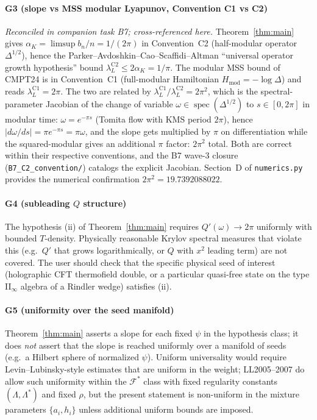 \documentclass[11pt]{article}
\theoremstyle{definition}
\DeclareMathOperator{\spec}{spec}
\newcommand{\modop}{\Delta}
\newcommand{\modhalf}{\modop^{1/2}}
\begin{document}
\paragraph{G3 (slope vs MSS modular Lyapunov, Convention C1 vs C2)}
\emph{Reconciled in companion task B7; cross-referenced here.}
Theorem~\ref{thm:main} gives $\alpha_K=\limsup b_n/n=1/(2\pi)$ in
Convention~C2 (half-modular operator $\modhalf$), hence the
Parker--Avdoshkin--Cao--Scaffidi--Altman ``universal operator growth
hypothesis'' bound $\lambda_L^{\mathrm{C2}}\le 2\alpha_K=1/\pi$.
The modular MSS bound of CMPT24 is in Convention~C1 (full-modular
Hamiltonian $H_{\mathrm{mod}}=-\log\modop$) and reads
$\lambda_L^{\mathrm{C1}}=2\pi$.  The two are related by
$\lambda_L^{\mathrm{C1}}/\lambda_L^{\mathrm{C2}}=2\pi^2$, which is
the spectral-parameter Jacobian of the change of variable
$\omega\in\spec(\modhalf)$ to $s\in[0,2\pi]$ in modular time:
$\omega = e^{-\pi s}$ (Tomita flow with KMS period $2\pi$),
hence $|d\omega/ds| = \pi e^{-\pi s} = \pi\omega$, and the slope
gets multiplied by $\pi$ on differentiation while the squared-modular
gives an additional $\pi$ factor: $2\pi^2$ total.  Both are correct
within their respective conventions, and the B7 wave-3 closure
(\texttt{B7\_C2\_convention/}) catalogs the explicit Jacobian.
Section~D of \texttt{numerics.py} provides the numerical confirmation
$2\pi^2=19.7392088022$.

\paragraph{G4 (subleading $Q$ structure)} The hypothesis (ii) of
Theorem~\ref{thm:main} requires $Q'(\omega)\to 2\pi$ uniformly with
bounded $T$-density.  Physically reasonable Krylov spectral measures
that violate this (e.g.\ $Q'$ that grows logarithmically, or $Q$ with
$x^2$ leading term) are not covered.  The user should check that the
specific physical seed of interest (holographic CFT thermofield double,
or a particular quasi-free state on the type II$_\infty$ algebra of a
Rindler wedge) satisfies (ii).

\paragraph{G5 (uniformity over the seed manifold)} Theorem~\ref{thm:main}
asserts a slope for each fixed $\psi$ in the hypothesis class; it does
\emph{not} assert that the slope is reached uniformly over a manifold
of seeds (e.g.\ a Hilbert sphere of normalized $\psi$).  Uniform
universality would require Levin--Lubinsky-style estimates that are
uniform in the weight; LL2005--2007 do allow such uniformity within the
$\mathcal{F}^*$ class with fixed regularity constants $(\Lambda,\Lambda^*)$
and fixed $\rho$, but the present statement is non-uniform in the
mixture parameters $\{a_i, h_i\}$ unless additional uniform bounds are
imposed.
\end{document}
